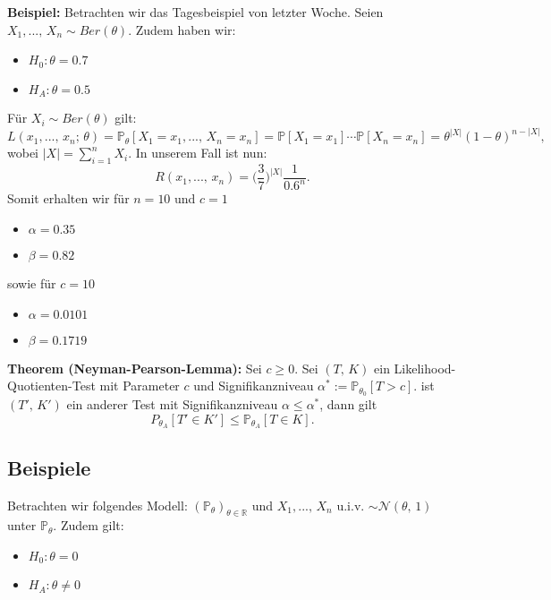 \documentclass[a4paper]{extarticle}
\begin{document}
\begin{ebox}
    \textbf{Beispiel:} Betrachten wir das Tagesbeispiel von letzter Woche. Seien $X_1,..., \, X_n \sim Ber(\theta)$. Zudem haben wir:
    \begin{itemize}
        \item $H_0 : \theta = 0.7$
        \item $H_A : \theta = 0.5$
    \end{itemize}
    Für $X_i \sim Ber(\theta)$ gilt:
    \[
        L(x_1,..., \, x_n; \, \theta) = \mathbb{P}_{\theta}[X_1 = x_1,..., \, X_n = x_n] = \mathbb{P}[X_1 = x_1] \cdots \mathbb{P}[X_n = x_n] = \theta^{|X|}(1 - \theta)^{n - |X|},
    \]
    wobei $|X| = \sum_{i = 1}^n X_i$. In unserem Fall ist nun:
    \[
        R(x_1,..., \, x_n) = \Big(\frac{3}{7}\Big)^{|X|}\frac{1}{0.6^n}.
    \]
    Somit erhalten wir für $n = 10$ und $c = 1$
    \begin{itemize}
        \item $\alpha = 0.35$
        \item $\beta = 0.82$
    \end{itemize}
    sowie für $c = 10$
    \begin{itemize}
        \item $\alpha = 0.0101$
        \item $\beta = 0.1719$
    \end{itemize}
\end{ebox}

\begin{tbox}
    \textbf{Theorem (Neyman-Pearson-Lemma):} Sei $c \geq 0$. Sei $(T, \, K)$ ein Likelihood-Quotienten-Test mit Parameter $c$ und Signifikanzniveau $\alpha^* := \mathbb{P}_{\theta_0}[T > c]$. ist $(T', \, K')$ ein anderer Test mit Signifikanzniveau $\alpha \leq \alpha^*$, dann gilt
    \[
        P_{\theta_A}[T' \in K'] \leq \mathbb{P}_{\theta_A}[T \in K].
    \]
\end{tbox}

\subsection{Beispiele}

Betrachten wir folgendes Modell: $(\mathbb{P}_{\theta})_{\theta \in \mathbb{R}}$ und $X_1,..., \, X_n$ u.i.v. $\sim \mathcal{N}(\theta, \, 1)$ unter $\mathbb{P}_{\theta}$. Zudem gilt:
\begin{itemize}
    \item $H_0 : \theta = 0$
    \item $H_A : \theta \neq 0$
\end{itemize}
\end{document}
